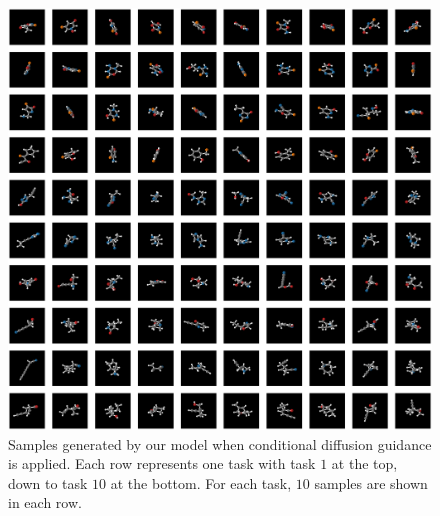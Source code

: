 \begin{figure}
    \centering
    \includegraphics[width=\textwidth]{figs/tddm/cond_samples_image_bright.png}
    \caption{Samples generated by our model when conditional diffusion guidance is applied. Each row represents one task with task $1$ at the top, down to task $10$ at the bottom. For each task, $10$ samples are shown in each row.}
    \label{fig:tddm-CondSampleExamples}
\end{figure}

